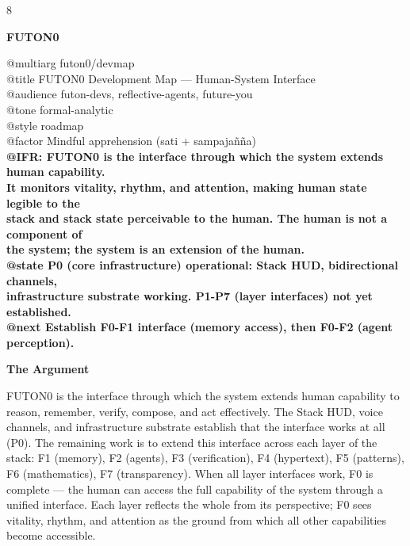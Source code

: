 \documentclass[landscape]{article}
\newenvironment{devmapactive}{%
  \def\FrameCommand{\colorbox{devmapactivebg}}%
  \setlength{\fboxsep}{2pt}%
  \MakeFramed{\advance\hsize-\width \FrameRestore}%
}{\endMakeFramed}
\begin{document}
\scriptsize\sffamily
\begin{paracol}{8}

\textbf{FUTON0}\par
\medskip
@multiarg futon0/devmap\\
@title FUTON0 Development Map — Human-System Interface\\
@audience futon-devs, reflective-agents, future-you\\
@tone formal-analytic\\
@style roadmap\\
@factor Mindful apprehension (sati + sampajañña)\\
\textbf{@IFR: FUTON0 is the interface through which the system extends human capability.}\\
\textbf{It monitors vitality, rhythm, and attention, making human state legible to the}\\
\textbf{stack and stack state perceivable to the human. The human is not a component of}\\
\textbf{the system; the system is an extension of the human.}\\
\textbf{@state P0 (core infrastructure) operational: Stack HUD, bidirectional channels,}\\
\textbf{infrastructure substrate working. P1-P7 (layer interfaces) not yet established.}\\
\textbf{@next Establish F0-F1 interface (memory access), then F0-F2 (agent perception).}\\
\par
\textbf{The Argument}\par
\par
FUTON0 is the interface through which the system extends human capability to reason, remember, verify, compose, and act effectively. The Stack HUD, voice channels, and infrastructure substrate establish that the interface works at all (P0). The remaining work is to extend this interface across each layer of the stack: F1 (memory), F2 (agents), F3 (verification), F4 (hypertext), F5 (patterns), F6 (mathematics), F7 (transparency). When all layer interfaces work, F0 is complete — the human can access the full capability of the system through a unified interface. Each layer reflects the whole from its perspective; F0 sees vitality, rhythm, and attention as the ground from which all other capabilities become accessible.\\
\par
\par
\begin{devmapactive}

\end{devmapactive}
\end{paracol}
\end{document}
